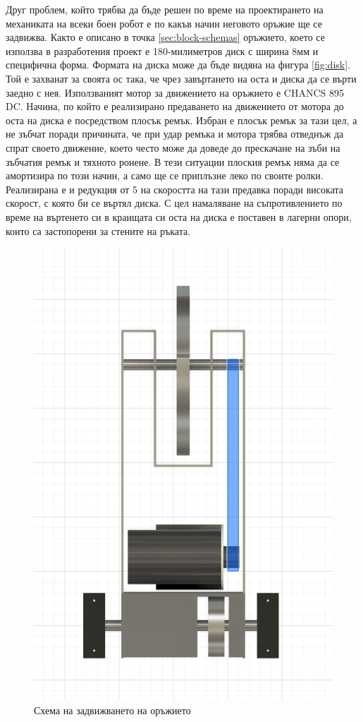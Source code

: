 Друг проблем, който трябва да бъде решен по време на проектирането на механиката на всеки боен робот е по какъв начин неговото оръжие ще се задвижва. Както е описано в точка \cref{sec:block-schemas} оръжието, което се използва в разработения проект е 180-милиметров диск с ширина 8мм и специфична форма. Формата на диска може да бъде видяна на фигура \cref{fig:disk}. Той е захванат за своята ос така, че чрез завъртането на оста и диска да се върти заедно с нея. Използваният мотор за движението на оръжието е CHANCS 895 DC. Начина, по който е реализирано предаването на движението от мотора до оста на диска е посредством плосък ремък. Избран е плосък ремък за тази цел, а не зъбчат поради причината, че при удар ремъка и мотора трябва отведнъж да спрат своето движение, което често може да доведе до прескачане на зъби на зъбчатия ремък и тяхното ронене. В тези ситуации плоския ремък няма да се амортизира по този начин, а само ще се приплъзне леко по своите ролки. Реализирана е и редукция от 5 на скоростта на тази предавка поради високата скорост, с която би се въртял диска. С цел намаляване на съпротивлението по време на въртенето си в краищата си оста на диска е поставен в лагерни опори, които са застопорени за стените на ръката.

\begin{figure}[H]
    \centering
    \includegraphics[width=0.8\linewidth]{images/hand-inside.png}
    
    \caption{Схема на задвижването на оръжието}
    \label{fig:hand-inside} 
\end{figure}
